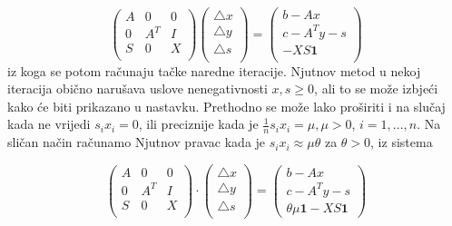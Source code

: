 \documentclass[a4paper, utf8, 11pt, colorlinks]{book}
\theoremstyle{definition}
\begin{document}
\begin{equation}
	\begin{pmatrix}
		A   & 0      &  0      \\
		0   & A^T    &  I      \\
		S   & 0      & X       \\
	\end{pmatrix}  
	\begin{pmatrix} 
		\bigtriangleup  x  \\
		\bigtriangleup  y  \\
		\bigtriangleup  s  \\
	\end{pmatrix} 
	= 
	\begin{pmatrix} 
		b - Ax             \\
		c - A^T y - s      \\
		- X S \textbf{1}  \\                   
	\end{pmatrix} 
\end{equation}
iz koga se potom računaju tačke naredne  iteracije. 
Njutnov metod   u nekoj iteracija obično narušava uslove nenegativnosti $x,s \geq 0$, ali to se može izbjeći kako će biti  prikazano u nastavku.   
Prethodno   se može lako proširiti i na slučaj kada ne vrijedi $s_ix_i = 0$, ili preciznije kada je $\frac{1}{n}s_ix_i = \mu, \mu > 0$, $i=1,\ldots,n$. Na sličan način računamo Njutnov pravac kada je $s_i x_i \approx \mu \theta$  za  $\theta >0$, iz sistema 

\begin{equation} \label{eq:newton-interior-system-k}    
	\begin{pmatrix}
		A   & 0      &  0      \\
		0   & A^T    &  I      \\
		S   & 0      & X       \\
	\end{pmatrix} 
	\cdot 
	\begin{pmatrix}
		\bigtriangleup  x  \\
		\bigtriangleup  y  \\
		\bigtriangleup  s  \\
	\end{pmatrix} 
	=
	\begin{pmatrix}
		b - Ax           \\
		c - A^T y - s      \\
		\theta \mu \mathbf{1} - X S \textbf{1}                      
	\end{pmatrix}
\end{equation}
\end{document}
